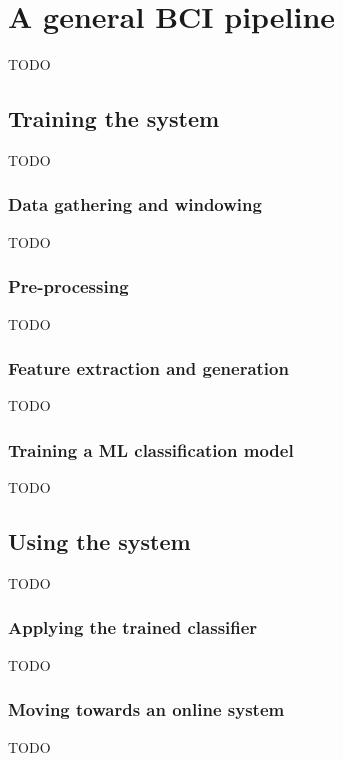 

\chapter{A general BCI pipeline}
\label{ch:bci_pipeline}
TODO

\section{Training the system}
\label{sec:bci_pipeline_training}
TODO


\subsection{Data gathering and windowing}
\label{subsec:bci_pipeline_training_data_gathering_windowing}
TODO


\subsection{Pre-processing}
\label{subsec:bci_pipeline_training_preprocessing}
TODO


\subsection{Feature extraction and generation}
\label{subsec:bci_pipeline_training_features}
TODO


\subsection{Training a ML classification model}
\label{subsec:bci_pipeline_training_classification_model}
TODO

\section{Using the system}
\label{sec:bci_pipeline_using}
TODO


\subsection{Applying the trained classifier}
\label{subsec:bci_pipeline_using_classifier}
TODO


\subsection{Moving towards an online system}
\label{subsec:bci_pipeline_using_going_online}
TODO

